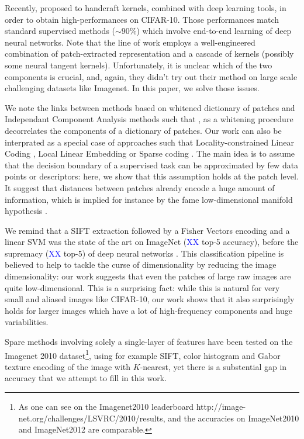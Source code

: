 \documentclass{article}
\newcommand{\Edouard}[1]{\textcolor{blue}{#1}}
\begin{document}
Recently, \citep{li2019enhanced,shankar2020neural} proposed to handcraft kernels, combined with deep learning tools, in order to obtain high-performances on CIFAR-10.
Those performances  match standard supervised methods ($\sim 90\%$) which involve end-to-end learning of deep neural networks.
Note that the line of work \citep{li2019enhanced,shankar2020neural,mairal2016end} employs a well-engineered combination of patch-extracted representation and a cascade of kernels (possibly some neural tangent kernels).
Unfortunately, it is unclear which of the two components is crucial, and, again, they didn't try out their method on large scale challenging datasets like Imagenet.
In this paper, we solve those issues.

{We  note the links between methods based on whitened dictionary of patches and Independant Component Analysis methods such that \citep{ngiam2010tiled}, as a whitening procedure decorrelates the components of a dictionary of patches. Our work can also be interprated as a special case of approaches such that Locality-constrained Linear Coding \citep{russakovsky2015imagenet,yu2010improved}, Local Linear Embedding \citep{Roweis2323} or Sparse coding \citep{bo2013multipath}. The main idea is to assume that the  decision boundary of a supervised task can be approximated by few data points or descriptors: here, we show that this assumption holds at the patch level. It suggest that distances between patches already encode a huge amount of information, which is implied for instance by the fame low-dimensional manifold hypothesis 
\citep{fefferman2016testing}. 

We remind that a SIFT extraction \cite{lowe2004distinctive} followed by a Fisher Vectors  encoding \citep{sanchez2013image} and a linear SVM was the state of the art on ImageNet (\Edouard{XX} top-5 accuracy), before the supremacy (\Edouard{XX} top-5) of deep neural networks \citet{krizhevsky2012imagenet}. This classification pipeline is believed to help to tackle the curse of dimensionality by reducing the image dimensionality: our work  suggests that even the patches of large raw images are quite low-dimensional. This is a surprising fact: while this is natural for very small and aliased  images like CIFAR-10, our work shows that it also surprisingly holds for larger images which have a lot of high-frequency components and huge variabilities.

Spare methods involving solely a single-layer of  features  have been tested on the Imagenet 2010 dataset\footnote{ As one can see on the Imagenet2010 leaderboard http://image-net.org/challenges/LSVRC/2010/results, and the accuracies on ImageNet2010 and ImageNet2012 are comparable.}, using for example SIFT, color histogram and Gabor texture encoding of the image with $K$-nearest, yet there is a substential gap in accuracy that we attempt to fill in this work.

}
\end{document}
